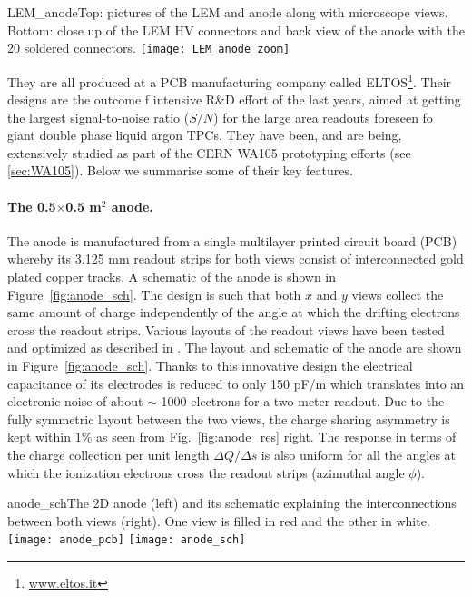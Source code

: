 \begin{cdrfigure}{LEM_anode}{Top: pictures of the LEM and anode along with microscope
  views. Bottom: close up of the LEM HV connectors and back view of the anode with the 20 soldered connectors.}
 \texttt{[image: LEM\_anode\_zoom]}  
 \end{cdrfigure}

 They are all produced at a PCB manufacturing company called  ELTOS\footnote{\url{www.eltos.it}}. Their designs are the outcome
  f intensive R\&D effort of the last years, aimed at getting the   largest signal-to-noise ratio ($S/N$) for the large area readouts
 foreseen fo giant double phase liquid argon TPCs. They have been,  and are being, extensively studied as part of the CERN WA105
 prototyping efforts (see \ref{sec:WA105}). Below we summarise  some of their key features.

 \paragraph{The 0.5$\times$0.5 m$^2$ anode.}
 The anode is manufactured from a single multilayer printed circuit board (PCB) whereby its 3.125 mm readout strips for both views
 consist of interconnected gold plated copper tracks. A schematic of  the anode is shown in Figure~\ref{fig:anode_sch}. The design is such that
 both $x$ and $y$ views collect the same amount of charge  independently of the angle at which the drifting electrons cross the
 readout strips. Various layouts of the readout views have been tested  and optimized as described in \cite{Cantini:2013yba}. The layout and
 schematic of the anode are shown in Figure~\ref{fig:anode_sch}.  Thanks  to this innovative design the electrical capacitance of its
 electrodes is reduced to only 150 pF/m which translates into an  electronic noise of about $\sim$ 1000 electrons for a two meter
 readout. Due to the fully symmetric layout between the two views, the  charge sharing asymmetry is kept within $1\%$ as seen from
 Fig.~\ref{fig:anode_res} right. The response in terms of the charge  collection per unit length $\Delta Q/\Delta s$ is also uniform for
 all the angles at which the ionization electrons cross the readout strips (azimuthal angle $\phi$).

\begin{cdrfigure}{anode_sch}{The 2D anode (left) and its schematic explaining the
       interconnections between both views (right). One view is filled
       in red and the other in white.}
     \texttt{[image: anode\_pcb]} \hspace{0.2cm} \texttt{[image: anode\_sch]}
\end{cdrfigure}


